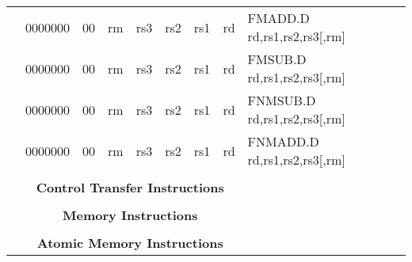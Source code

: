 \begin{table}[p]
\begin{small}
\begin{center}
\begin{tabular}{rcccccccccl}
&
\multicolumn{1}{|c|}{0000000} &
\multicolumn{1}{c|}{00} &
\multicolumn{2}{c|}{rm} &
\multicolumn{2}{c|}{rs3} &
\multicolumn{1}{c|}{rs2} &
\multicolumn{1}{c|}{rs1} &
\multicolumn{1}{c|}{rd} & FMADD.D rd,rs1,rs2,rs3[,rm] \\
\cline{2-10}
  

&
\multicolumn{1}{|c|}{0000000} &
\multicolumn{1}{c|}{00} &
\multicolumn{2}{c|}{rm} &
\multicolumn{2}{c|}{rs3} &
\multicolumn{1}{c|}{rs2} &
\multicolumn{1}{c|}{rs1} &
\multicolumn{1}{c|}{rd} & FMSUB.D rd,rs1,rs2,rs3[,rm] \\
\cline{2-10}
  

&
\multicolumn{1}{|c|}{0000000} &
\multicolumn{1}{c|}{00} &
\multicolumn{2}{c|}{rm} &
\multicolumn{2}{c|}{rs3} &
\multicolumn{1}{c|}{rs2} &
\multicolumn{1}{c|}{rs1} &
\multicolumn{1}{c|}{rd} & FNMSUB.D rd,rs1,rs2,rs3[,rm] \\
\cline{2-10}
  

&
\multicolumn{1}{|c|}{0000000} &
\multicolumn{1}{c|}{00} &
\multicolumn{2}{c|}{rm} &
\multicolumn{2}{c|}{rs3} &
\multicolumn{1}{c|}{rs2} &
\multicolumn{1}{c|}{rs1} &
\multicolumn{1}{c|}{rd} & FNMADD.D rd,rs1,rs2,rs3[,rm] \\
\cline{2-10}
  

&
\multicolumn{9}{c}{} & \\
&
\multicolumn{9}{c}{\bf Control Transfer Instructions} & \\
\cline{2-10}
  

&
\multicolumn{9}{c}{} & \\
&
\multicolumn{9}{c}{\bf Memory Instructions} & \\
\cline{2-10}
  

&
\multicolumn{9}{c}{} & \\
&
\multicolumn{9}{c}{\bf Atomic Memory Instructions} & \\
\cline{2-10}
  

\end{tabular}
\end{center}
\end{small}

\label{instr-table}
\end{table}
  

\newpage

